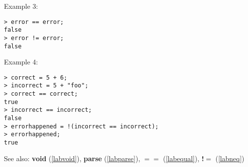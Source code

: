 \noindent Example 3: 
\begin{center}\begin{minipage}{15cm}\begin{Verbatim}[frame=single]
> error == error;
false
> error != error;
false
\end{Verbatim}
\end{minipage}\end{center}
\noindent Example 4: 
\begin{center}\begin{minipage}{15cm}\begin{Verbatim}[frame=single]
> correct = 5 + 6;
> incorrect = 5 + "foo";
> correct == correct;
true
> incorrect == incorrect;
false
> errorhappened = !(incorrect == incorrect);
> errorhappened;
true
\end{Verbatim}
\end{minipage}\end{center}
See also: \textbf{void} (\ref{labvoid}), \textbf{parse} (\ref{labparse}), \textbf{$==$} (\ref{labequal}), \textbf{!$=$} (\ref{labneq})

